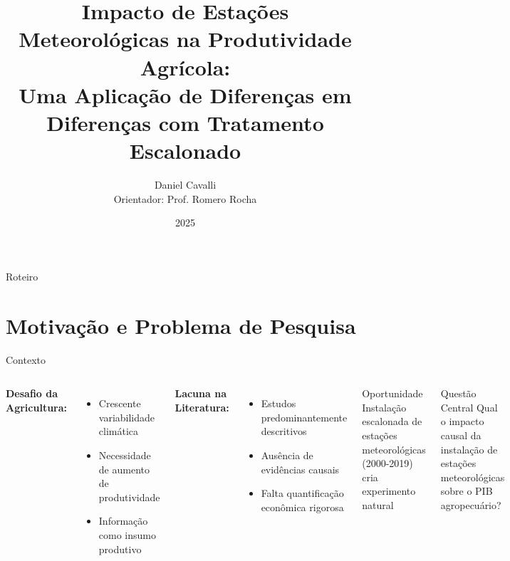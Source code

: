 \documentclass[10pt,aspectratio=169]{beamer}
\title[Estações Meteorológicas e Produtividade Agrícola]{Impacto de Estações Meteorológicas na Produtividade Agrícola: \\ Uma Aplicação de Diferenças em Diferenças com Tratamento Escalonado}
\author[Daniel Cavalli]{Daniel Cavalli \\ \small Orientador: Prof. Romero Rocha}
\institute[IE-UFRJ]{
  Instituto de Economia\\
  Universidade Federal do Rio de Janeiro
}
\date{2025}
\begin{document}
\begin{frame}
\titlepage
\end{frame}

\begin{frame}{Roteiro}
\tableofcontents
\end{frame}

\section{Motivação e Problema de Pesquisa}

\begin{frame}{Contexto}
\begin{columns}
\textbf{Desafio da Agricultura:}
\begin{itemize}
    \item Crescente variabilidade climática
    \item Necessidade de aumento de produtividade
    \item Informação como insumo produtivo
\end{itemize}

\vspace{0.5cm}
\textbf{Lacuna na Literatura:}
\begin{itemize}
    \item Estudos predominantemente descritivos
    \item Ausência de evidências causais
    \item Falta quantificação econômica rigorosa
\end{itemize}

\begin{block}{Oportunidade}
Instalação escalonada de estações meteorológicas (2000-2019) cria experimento natural
\end{block}

\vspace{0.3cm}
\begin{alertblock}{Questão Central}
Qual o impacto causal da instalação de estações meteorológicas sobre o PIB agropecuário?
\end{alertblock}
\end{columns}
\end{frame}
\end{document}
